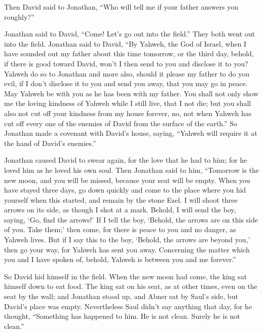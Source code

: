  Then David said to Jonathan, ``Who will tell me if your
father answers you roughly?''

 Jonathan said to David, ``Come! Let's go out into the
field.'' They both went out into the field.  Jonathan said
to David, ``By Yahweh, the God of Israel, when I have sounded out my
father about this time tomorrow, or the third day, behold, if there is
good toward David, won't I then send to you and disclose it to you?
 Yahweh do so to Jonathan and more also, should it please
my father to do you evil, if I don't disclose it to you and send you
away, that you may go in peace. May Yahweh be with you as he has been
with my father.  You shall not only show me the loving
kindness of Yahweh while I still live, that I not die;  but
you shall also not cut off your kindness from my house forever, no, not
when Yahweh has cut off every one of the enemies of David from the
surface of the earth.''  So Jonathan made a covenant with
David's house, saying, ``Yahweh will require it at the hand of David's
enemies.''

 Jonathan caused David to swear again, for the love that he
had to him; for he loved him as he loved his own soul. 
Then Jonathan said to him, ``Tomorrow is the new moon, and you will be
missed, because your seat will be empty.  When you have
stayed three days, go down quickly and come to the place where you hid
yourself when this started, and remain by the stone Ezel. 
I will shoot three arrows on its side, as though I shot at a mark.
 Behold, I will send the boy, saying, `Go, find the
arrows!' If I tell the boy, `Behold, the arrows are on this side of you.
Take them;' then come, for there is peace to you and no danger, as
Yahweh lives.  But if I say this to the boy, `Behold, the
arrows are beyond you,' then go your way, for Yahweh has sent you away.
 Concerning the matter which you and I have spoken of,
behold, Yahweh is between you and me forever.''

 So David hid himself in the field. When the new moon had
come, the king sat himself down to eat food.  The king sat
on his seat, as at other times, even on the seat by the wall; and
Jonathan stood up, and Abner sat by Saul's side, but David's place was
empty.  Nevertheless Saul didn't say anything that day, for
he thought, ``Something has happened to him. He is not clean. Surely he
is not clean.''

